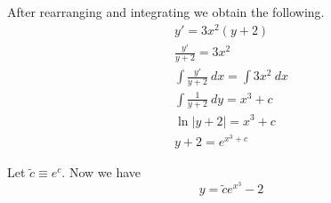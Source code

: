 \begin{enumerate}
		After rearranging and integrating we obtain the following.
		\begin{gather}
			y' = 3x^2 (y+2)\\
			\frac{y'}{y+2} = 3x^2\\
			\int \frac{y'}{y+2}\ dx = \int 3x^2\ dx\\
			\int \frac{1}{y+2}\ dy = x^3 + c\\
			\ln \vert y+2 \vert = x^3 + c\\
			y + 2 = e^{x^3 + c}
		\end{gather}

		Let \(\tilde{c} \equiv e^c\). Now we have
		\[y = \tilde{c} e^{x^3} - 2\]

\end{enumerate}